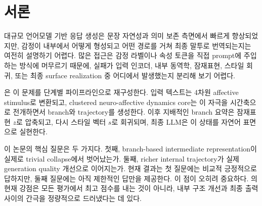 \section{서론}

대규모 언어모델 기반 응답 생성은 문장 자연성과 의미 보존 측면에서 빠르게 향상되었지만, 감정이 내부에서 어떻게 형성되고 어떤 경로를 거쳐 최종 말투로 번역되는지는 여전히 설명하기 어렵다. 많은 접근은 감정 라벨이나 속성 토큰을 직접 prompt에 주입하는 방식에 머무르기 때문에, 실패가 입력 인코더, 내부 동역학, 잠재표현, 스타일 회귀, 또는 최종 surface realization 중 어디에서 발생했는지 분리해 보기 어렵다.

\EmoNet{}은 이 문제를 단계별 파이프라인으로 재구성한다. 입력 텍스트는 4차원 affective stimulus로 변환되고, clustered neuro-affective dynamics core는 이 자극을 시간축으로 전개하면서 branch와 trajectory를 생성한다. 이후 지배적인 branch 요약은 잠재표현 $z$로 압축되고, 다시 스타일 벡터 $s$로 회귀되며, 최종 LLM은 이 상태를 자연어 표면으로 실현한다.

이 논문의 핵심 질문은 두 가지다. 첫째, branch-based intermediate representation이 실제로 trivial collapse에서 벗어났는가. 둘째, richer internal trajectory가 실제 generation quality 개선으로 이어지는가. 현재 결과는 첫 질문에는 비교적 긍정적으로 답하지만, 둘째 질문에는 아직 제한적인 답만을 제공한다. 이 점이 오히려 중요하다. \EmoNet{}의 현재 강점은 모든 평가에서 최고 점수를 내는 것이 아니라, 내부 구조 개선과 최종 출력 사이의 간극을 정량적으로 드러냈다는 데 있다.
